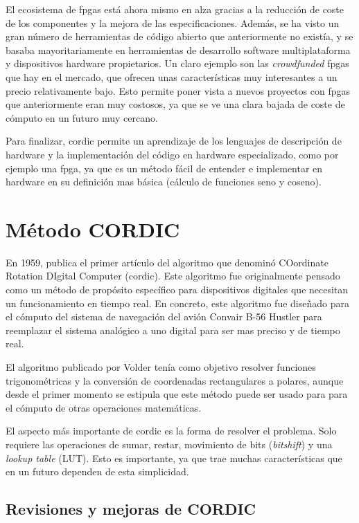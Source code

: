 El ecosistema de \gls{fpga}s está ahora mismo en alza gracias a la reducción de coste de los componentes y la mejora de las especificaciones. Además, se ha visto un gran número de herramientas de código abierto que anteriormente no existía, y se basaba mayoritariamente en herramientas de desarrollo software multiplataforma y dispositivos hardware propietarios. Un claro ejemplo son las \textit{crowdfunded} \gls{fpga}s que hay en el mercado, que ofrecen unas características muy interesantes a un precio relativamente bajo. Esto permite poner vista a nuevos proyectos con \gls{fpga}s que anteriormente eran muy costosos, ya que se ve una clara bajada de coste de cómputo en un futuro muy cercano.

Para finalizar, \gls{cordic} permite un aprendizaje de los lenguajes de descripción de hardware y la implementación del código en hardware especializado, como por ejemplo una \gls{fpga}, ya que es un método fácil de entender e implementar en hardware en su definición mas básica (cálculo de funciones seno y coseno).

\section{Método CORDIC}

En 1959, \citeauthor{volder_cordic_1959} publica el primer artículo del algoritmo que denominó COordinate Rotation DIgital Computer (\gls{cordic}). Este algoritmo fue originalmente pensado como un método de propósito específico para dispositivos digitales que necesitan un funcionamiento en tiempo real. En concreto, este algoritmo fue diseñado para el cómputo del sistema de navegación del avión Convair B-56 Hustler para reemplazar el sistema analógico a uno digital para ser mas preciso y de tiempo real. 

El algoritmo publicado por Volder tenía como objetivo resolver funciones trigonométricas y la conversión de coordenadas rectangulares a polares, aunque desde el primer momento se estipula que este método puede ser usado para para el cómputo de otras operaciones matemáticas.

El aspecto más importante de \gls{cordic} es la forma de resolver el problema. Solo requiere las operaciones de sumar, restar, movimiento de bits (\textit{bitshift}) y una \textit{lookup table} (LUT). Esto es importante, ya que trae muchas características que en un futuro dependen de esta simplicidad.


\subsection{Revisiones y mejoras de CORDIC}

